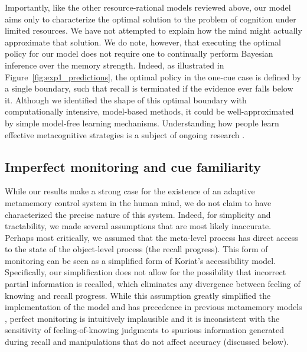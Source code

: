 Importantly, like the other resource-rational models reviewed above, our model aims only to characterize the optimal solution to the problem of cognition under limited resources. We have not attempted to explain how the mind might actually approximate that solution. We do note, however, that executing the optimal policy for our model does not require one to continually perform Bayesian inference over the memory strength. Indeed, as illustrated in Figure~\ref{fig:exp1_predictions}, the optimal policy in the one-cue case is defined by a single boundary, such that recall is terminated if the evidence ever falls below it. Although we identified the shape of this optimal boundary with computationally intensive, model-based methods, it could be well-approximated by simple model-free learning mechanisms. Understanding how people learn effective metacognitive strategies is a subject of ongoing research \citep{lieder2018rational,jain2019how,callaway2022leveraging,binz2022heuristics,he2022where}.

\subsection{Imperfect monitoring and cue familiarity}
While our results make a strong case for the existence of an adaptive metamemory control system in the human mind, we do not claim to have characterized the precise nature of this system. Indeed, for simplicity and tractability, we made several assumptions that are most likely inaccurate. 
Perhaps most critically, we assumed that the meta-level process has direct access to the state of the object-level process (the recall progress). This form of monitoring can be seen as a simplified form of Koriat's \citeyearpar{koriat1993how} accessibility model. Specifically, our simplification does not allow for the possibility that incorrect partial information is recalled, which eliminates any divergence between feeling of knowing and recall progress. While this assumption greatly simplified the implementation of the model and has precedence in previous metamemory models \citep{suchow2016deciding,hu2019role}, perfect monitoring is intuitively implausible and it is inconsistent with the sensitivity of feeling-of-knowing judgments to spurious information generated during recall \citep{koriat1993how} and manipulations that do not affect accuracy (discussed below).

